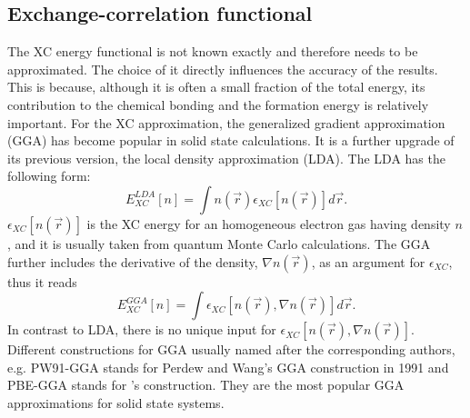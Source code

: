 \subsection{Exchange-correlation functional}
The XC energy functional is not known exactly and therefore needs to be approximated. The choice of it directly influences the accuracy of the results. This is because, although it is often a small fraction of the total energy, its contribution to the chemical bonding and the formation energy is relatively important. For the XC approximation, the generalized gradient approximation (GGA) has become popular in solid state calculations. It is a further upgrade of its previous version, the local density approximation (LDA). The LDA has the following form:
\begin{equation}
E_{XC}^{LDA}[n]=\int n(\vec{r})\epsilon_{XC}[n(\vec{r})]d\vec{r}.
\end{equation}
$\epsilon_{XC}[n(\vec{r})]$ is the XC energy for an homogeneous electron gas having density $n$, and it is usually taken from quantum Monte Carlo calculations. The GGA further includes the derivative of the density, $\nabla n(\vec{r})$, as an argument for $\epsilon_{XC}$, thus it reads
\begin{equation}
E_{XC}^{GGA}[n]=\int \epsilon_{XC}[n(\vec{r}),\nabla n(\vec{r})]d\vec{r}.
\end{equation}
In contrast to LDA, there is no unique input for $\epsilon_{XC}[n(\vec{r}),\nabla n(\vec{r})]$. Different constructions for GGA usually named after the corresponding authors, e.g. PW91-GGA stands for Perdew and Wang's GGA construction in 1991\cite{Perdew1991,Perdew1992} and PBE-GGA stands for \citet{GGA-PBE2}'s construction. They are the most popular GGA approximations for solid state systems. 
